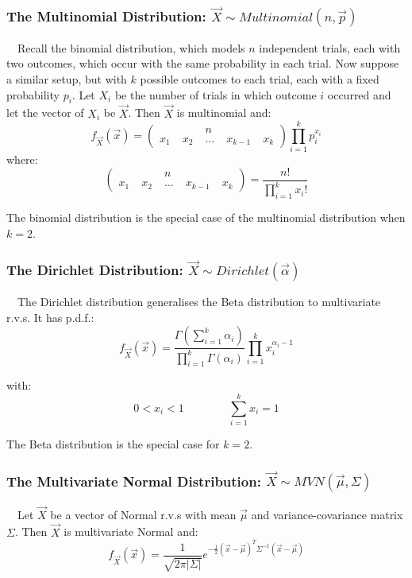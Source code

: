 \documentclass[12pt,a4paper]{article}
\begin{document}
\subsubsection{The Multinomial Distribution: $\vec{X}\sim Multinomial(n, \vec{p})$}

$\quad$Recall the binomial distribution, which models $n$ independent trials, each with two outcomes, which occur with the same probability in each trial. Now suppose a similar setup, but with $k$ possible outcomes to each trial, each with a fixed probability $p_i$. Let $X_i$ be the number of trials in which outcome $i$ occurred and let the vector of $X_i$ be $\vec{X}$. Then $\vec{X}$ is multinomial and:
$$f_{\vec{X}}(\vec{x}) = \left(\begin{array}{ccccc} & & n\;& & \\ x_1\;&x_2\;&\hdots\;&x_{k-1}\;&x_k\end{array}\right)\prod_{i=1}^k p_i^{x_i}$$
where:
$$\left(\begin{array}{ccccc} & & n\;& & \\ x_1\;&x_2\;&\hdots\;&x_{k-1}\;&x_k\end{array}\right) = \frac{n!}{\prod\limits_{i=1}^k x_i!}$$

The binomial distribution is the special case of the multinomial distribution when $k=2$.

\subsubsection{The Dirichlet Distribution: $\vec{X}\sim Dirichlet(\vec{\alpha})$}

$\quad$The Dirichlet distribution generalises the Beta distribution to multivariate r.v.s. It has p.d.f.:
$$f_{\vec{X}}(\vec{x}) = \frac{\Gamma(\sum\limits_{i=1}^k \alpha_i)}{\prod\limits_{i=1}^k \Gamma(\alpha_i)} \prod_{i=1}^k x_i^{\alpha_i -1}$$

with:
$$0 < x_i < 1\qquad\qquad \sum_{i=1}^k x_i = 1$$

The Beta distribution is the special case for $k=2$.

\subsubsection{The Multivariate Normal Distribution: $\vec{X} \sim MVN(\vec{\mu},\Sigma)$}

$\quad$Let $\vec{X}$ be a vector of Normal r.v.s with mean $\vec{\mu}$ and variance-covariance matrix $\Sigma$. Then $\vec{X}$ is multivariate Normal and:
$$f_{\vec{X}}(\vec{x}) = \frac{1}{\sqrt{2 \pi |\Sigma|}}e^{-\frac{1}{2}(\vec{x}-\vec{\mu})^T\Sigma^{-1}(\vec{x}-\vec{\mu})}$$
\end{document}
